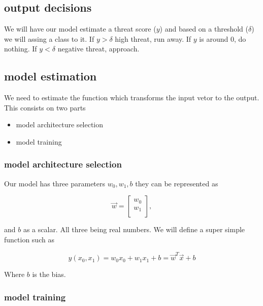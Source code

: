 \documentclass[twocolumn]{article}
\begin{document}
\subsection{output decisions}

We will have our model estimate a threat score ($y$) and based on a threshold
($\delta$) we will assing a class to it. If $y > \delta$ high threat, run away.
If $y$  is around 0, do nothing. If $y < \delta$ negative threat,
approach.

\subsection{model estimation}

We need to estimate the function which transforms the input vetor to the
output. This consists on two parts

\begin{itemize}
  \item model architecture selection
  \item model training
\end{itemize}

\subsubsection{model architecture selection}

Our model has three parameters $w_0, w_1, b$ they can be represented as 

\begin{equation}
    \vec{w} = \begin{bmatrix}
                w_0 \\
                w_1 \\
              \end{bmatrix}, 
\end{equation}

and $b$ as a scalar. All three being real numbers. We will define a super
simple function such as 

\noindent
\begin{equation}
    y(x_0, x_1) = w_0  x_0 + w_1  x_1 + b = \vec{w}^T\vec{x} + b
\end{equation}

Where $b$ is the bias.

\subsubsection{model training}
\end{document}

